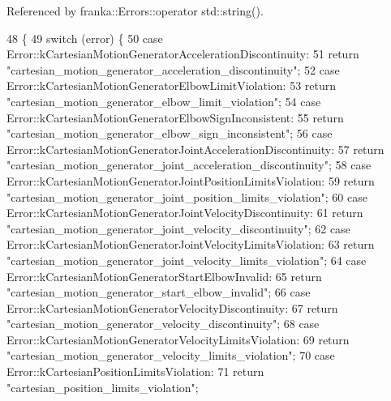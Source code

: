 Referenced by franka\+::\+Errors\+::operator std\+::string().


\begin{DoxyCode}
48                                       \{
49   \textcolor{keywordflow}{switch} (error) \{
50     \textcolor{keywordflow}{case} Error::kCartesianMotionGeneratorAccelerationDiscontinuity:
51       \textcolor{keywordflow}{return} \textcolor{stringliteral}{"cartesian\_motion\_generator\_acceleration\_discontinuity"};
52     \textcolor{keywordflow}{case} Error::kCartesianMotionGeneratorElbowLimitViolation:
53       \textcolor{keywordflow}{return} \textcolor{stringliteral}{"cartesian\_motion\_generator\_elbow\_limit\_violation"};
54     \textcolor{keywordflow}{case} Error::kCartesianMotionGeneratorElbowSignInconsistent:
55       \textcolor{keywordflow}{return} \textcolor{stringliteral}{"cartesian\_motion\_generator\_elbow\_sign\_inconsistent"};
56     \textcolor{keywordflow}{case} Error::kCartesianMotionGeneratorJointAccelerationDiscontinuity:
57       \textcolor{keywordflow}{return} \textcolor{stringliteral}{"cartesian\_motion\_generator\_joint\_acceleration\_discontinuity"};
58     \textcolor{keywordflow}{case} Error::kCartesianMotionGeneratorJointPositionLimitsViolation:
59       \textcolor{keywordflow}{return} \textcolor{stringliteral}{"cartesian\_motion\_generator\_joint\_position\_limits\_violation"};
60     \textcolor{keywordflow}{case} Error::kCartesianMotionGeneratorJointVelocityDiscontinuity:
61       \textcolor{keywordflow}{return} \textcolor{stringliteral}{"cartesian\_motion\_generator\_joint\_velocity\_discontinuity"};
62     \textcolor{keywordflow}{case} Error::kCartesianMotionGeneratorJointVelocityLimitsViolation:
63       \textcolor{keywordflow}{return} \textcolor{stringliteral}{"cartesian\_motion\_generator\_joint\_velocity\_limits\_violation"};
64     \textcolor{keywordflow}{case} Error::kCartesianMotionGeneratorStartElbowInvalid:
65       \textcolor{keywordflow}{return} \textcolor{stringliteral}{"cartesian\_motion\_generator\_start\_elbow\_invalid"};
66     \textcolor{keywordflow}{case} Error::kCartesianMotionGeneratorVelocityDiscontinuity:
67       \textcolor{keywordflow}{return} \textcolor{stringliteral}{"cartesian\_motion\_generator\_velocity\_discontinuity"};
68     \textcolor{keywordflow}{case} Error::kCartesianMotionGeneratorVelocityLimitsViolation:
69       \textcolor{keywordflow}{return} \textcolor{stringliteral}{"cartesian\_motion\_generator\_velocity\_limits\_violation"};
70     \textcolor{keywordflow}{case} Error::kCartesianPositionLimitsViolation:
71       \textcolor{keywordflow}{return} \textcolor{stringliteral}{"cartesian\_position\_limits\_violation"};

\end{DoxyCode}
